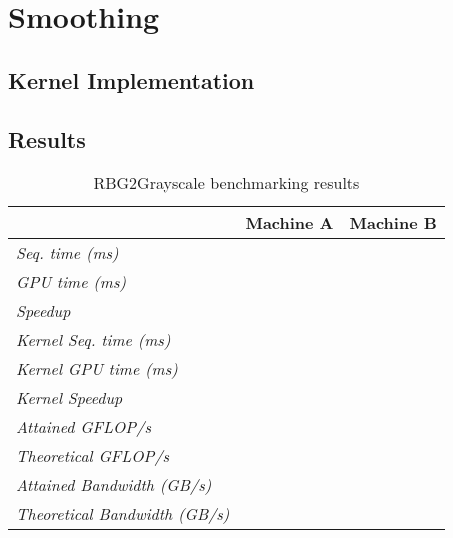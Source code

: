 \documentclass[final]{report}
\begin{document}
\chapter{Smoothing}

\section{Kernel Implementation}



\section{Results}
\begin{table}[H]
	\centering
	\caption{RBG2Grayscale benchmarking results}
	\label{tab:rgb2grayscale-results}
	\begin{tabular}{lll}
	\toprule
											& \textbf{Machine A} 	& \textbf{Machine B} \\
	\midrule
	\textit{Seq. time (ms)} 				& ~ 					& ~ \\
	\textit{GPU time (ms)} 					& ~ 					& ~ \\
	\textit{Speedup} 						& ~ 					& ~ \\
	\midrule
	\textit{Kernel Seq. time (ms)} 			& ~ 					& ~ \\
	\textit{Kernel GPU time (ms)} 			& ~ 					& ~ \\
	\textit{Kernel Speedup} 				& ~ 					& ~ \\
	\midrule
	\textit{Attained GFLOP/s} 				& ~ 					& ~ \\
	\textit{Theoretical GFLOP/s} 			& ~ 					& ~ \\
	\textit{Attained Bandwidth (GB/s)}		& ~ 					& ~ \\
	\textit{Theoretical Bandwidth (GB/s)}	& ~ 					& ~ \\
	\bottomrule
	\end{tabular}
\end{table}
\end{document}

